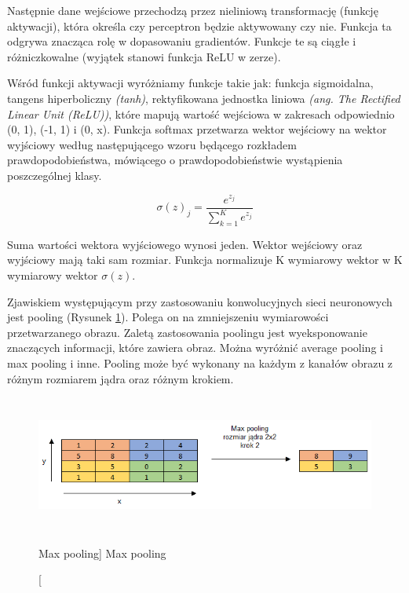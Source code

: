\documentclass[a4paper,12pt]{article}
\begin{document}
			Następnie dane wejściowe przechodzą przez nieliniową transformację (funkcję aktywacji), która określa czy perceptron będzie aktywowany czy nie. 
			Funkcja ta odgrywa znacząca rolę w dopasowaniu gradientów. Funkcje te są ciągłe i różniczkowalne (wyjątek stanowi funkcja ReLU w zerze).
        
			Wśród funkcji aktywacji wyróżniamy funkcje takie jak: funkcja sigmoidalna,  tangens hiperboliczny \textit{(tanh)}, rektyfikowana jednostka liniowa 
			\textit{(ang. The Rectified Linear Unit (ReLU))}, które mapują wartość wejściowa w zakresach odpowiednio (0, 1), (-1, 1) i (0, x). Funkcja softmax przetwarza wektor wejściowy na wektor wyjściowy według następującego wzoru będącego rozkładem prawdopodobieństwa, 
			mówiącego o prawdopodobieństwie wystąpienia poszczególnej klasy. 
        \begin{center}
			\begin{displaymath}
				\sigma (z)_{j} = \frac{e^{z_{j}}}{ \sum_{k=1}^K e^{z_{j}}}
			\end{displaymath}
			\end{center}
			Suma wartości wektora wyjściowego wynosi jeden. Wektor wejściowy oraz wyjściowy mają taki sam rozmiar. Funkcja normalizuje K wymiarowy wektor w K wymiarowy wektor  
			$ \sigma (z)$. 
        
	    Zjawiskiem występującym przy zastosowaniu konwolucyjnych sieci neuronowych jest pooling (Rysunek \ref{fig:maxPooling}). Polega on na zmniejszeniu wymiarowości 
			przetwarzanego obrazu. Zaletą zastosowania poolingu jest wyeksponowanie znaczących informacji, które zawiera obraz. Można wyróżnić average 
			pooling i max pooling i inne. Pooling może być wykonany na każdym z kanałów obrazu z różnym rozmiarem jądra oraz różnym krokiem. 
	 
			\begin{figure}[!ht]
				\centering
				\includegraphics[width=17cm, height=4.5cm]{image//maxPoolingImg.png}
				\caption
				[Max pooling]
				{Max pooling}
				\label{fig:maxPooling}
			\end{figure}
        
\end{document}
